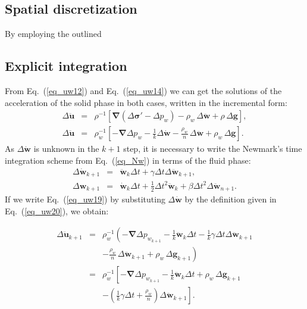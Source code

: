 \documentclass[twocolumn]{svjour3}          %
\begin{document}
\subsection{Spatial discretization}
\label{subsec:41}


By employing the outlined 

\subsection{Explicit integration}
\label{subsec:42}
From Eq.~(\ref{eq_uw12}) and Eq.~(\ref{eq_uw14}) we can get the solutions of the acceleration of the solid phase in both cases, written in the incremental form:
\begin{eqnarray}
\Delta\boldsymbol{ \ddot{u}} &=&  \rho^{-1} \left[\boldsymbol{ \nabla }\left (\Delta\boldsymbol{ \sigma'}-\Delta p_w\right) - \rho_{w}  \, \Delta\boldsymbol{  \ddot{w} } +\rho \, \Delta\boldsymbol{ g}  \right], \label{eq_uw18} \\
\Delta\boldsymbol{  \ddot{u}} &=&\rho_{w}^{-1} \left[ - \boldsymbol{ \nabla} \Delta p_{w}-  \frac{1}{k}\Delta\boldsymbol{ \dot{w}} -\frac{\rho_{w}}{n}  \,\Delta\boldsymbol{  \ddot{w} }+\rho_{w} \,  \Delta\boldsymbol{g} \right ]. \label{eq_uw19} 
\end{eqnarray}
As $\Delta\boldsymbol{ \dot{w}}$ is  unknown in the $k+1$ step, it is necessary to write the Newmark's time integration scheme from Eq.~(\ref{eq_Nw}) in terms of the fluid phase:
\begin{eqnarray}
\Delta\dot{\boldsymbol{w}}_{k+1}&=&\ddot{\boldsymbol{w}}_{k} \Delta t+\gamma \Delta t \Delta \ddot{\boldsymbol{w}}_{k+1}\label{eq_uw20},\\
\Delta\boldsymbol{w}_{k+1}&=&\dot{\boldsymbol{w}}_{k} \Delta t+\frac{1}{2} \Delta t^{2} \ddot{\boldsymbol{w}}_{k}
+\beta\Delta t^{2} \Delta \ddot{\textbf{w}}_{n+1}.
\end{eqnarray}\label{eq_uw21}
If we write Eq.~(\ref{eq_uw19})  by substituting $\Delta\boldsymbol{ \dot{w}}$  by the definition given in Eq.~(\ref{eq_uw20}), we obtain:

\begin{eqnarray}\label{eq_uw22}
 \Delta\boldsymbol{  \ddot{u}}_{k+1} &=& \rho_{w}^{-1} \left ( - \boldsymbol{ \nabla} \Delta p_{w_{k+1}}- \frac{1}{k} \ddot{\boldsymbol{w}}_{k}\Delta t- \frac{1}{k} \gamma\Delta t\Delta \ddot{\boldsymbol{w}}_{k+1} \right .
 \nonumber \\
& & \left .- \frac{\rho_{w}}{n}  \,\Delta\boldsymbol{  \ddot{w} }_{k+1}+\rho_{w} \,  \Delta\boldsymbol{ g}_{k+1} \right )  \nonumber \\
& =& \rho_{w}^{-1} \left [- \boldsymbol{ \nabla} \Delta p_{w_{k+1}}- \frac{1}{k} \ddot{\boldsymbol{w}}_{k}\Delta t +\rho_{w} \,  \Delta\boldsymbol{ g}_{k+1}  \right .
\nonumber \\
& & - \left . \left(\frac{1}{k} \gamma \Delta t +\frac{\rho_{w}}{n}  \right) \Delta\boldsymbol{  \ddot{w} }_{k+1} \right ].
\end{eqnarray}
\end{document}
